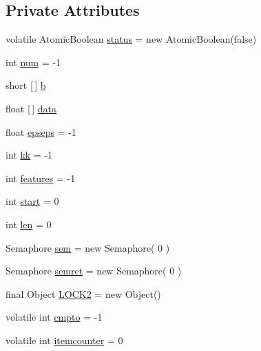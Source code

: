 \subsection*{Private Attributes}
\begin{DoxyCompactItemize}
\item 
volatile Atomic\+Boolean \mbox{\hyperlink{classcom_1_1example_1_1dmocl_1_1dbscan_1_1dbscan__thread2_af5d85cbd68b1063d67e118eb4d99f00d}{status}} = new Atomic\+Boolean(false)
\item 
int \mbox{\hyperlink{classcom_1_1example_1_1dmocl_1_1dbscan_1_1dbscan__thread2_a8c3589585ee7d3dffb56f2815e4cfe5e}{num}} = -\/1
\item 
short \mbox{[}$\,$\mbox{]} \mbox{\hyperlink{classcom_1_1example_1_1dmocl_1_1dbscan_1_1dbscan__thread2_a1eb51ad414e8ce37f6fc7a366a9631f9}{b}}
\item 
float \mbox{[}$\,$\mbox{]} \mbox{\hyperlink{classcom_1_1example_1_1dmocl_1_1dbscan_1_1dbscan__thread2_a1e074f4d486050d2cdd34f11340163d9}{data}}
\item 
float \mbox{\hyperlink{classcom_1_1example_1_1dmocl_1_1dbscan_1_1dbscan__thread2_a925553795864906a7e2b06f30d377e6a}{epseps}} = -\/1
\item 
int \mbox{\hyperlink{classcom_1_1example_1_1dmocl_1_1dbscan_1_1dbscan__thread2_a20cf1118178a289fb4f6a4cf0ae79781}{kk}} = -\/1
\item 
int \mbox{\hyperlink{classcom_1_1example_1_1dmocl_1_1dbscan_1_1dbscan__thread2_af7a32b720e9757e7ea87de852cb928fa}{features}} = -\/1
\item 
int \mbox{\hyperlink{classcom_1_1example_1_1dmocl_1_1dbscan_1_1dbscan__thread2_a069afa516eb9cd0c10e2bd860a97475c}{start}} = 0
\item 
int \mbox{\hyperlink{classcom_1_1example_1_1dmocl_1_1dbscan_1_1dbscan__thread2_a3f37b04b0d50bc1a313285cc42c97b52}{len}} = 0
\item 
Semaphore \mbox{\hyperlink{classcom_1_1example_1_1dmocl_1_1dbscan_1_1dbscan__thread2_acfcf87a7da9d4f495f7d886b7ef16bf0}{sem}} = new Semaphore( 0 )
\item 
Semaphore \mbox{\hyperlink{classcom_1_1example_1_1dmocl_1_1dbscan_1_1dbscan__thread2_a84386ee69872fc108454e9feda715f1a}{semret}} = new Semaphore( 0 )
\item 
final Object \mbox{\hyperlink{classcom_1_1example_1_1dmocl_1_1dbscan_1_1dbscan__thread2_a2baeae9915a08e8feb9be52e169afef5}{L\+O\+C\+K2}} = new Object()
\item 
volatile int \mbox{\hyperlink{classcom_1_1example_1_1dmocl_1_1dbscan_1_1dbscan__thread2_ad857c20706749d220416cf6d5bfa8925}{cmpto}} = -\/1
\item 
volatile int \mbox{\hyperlink{classcom_1_1example_1_1dmocl_1_1dbscan_1_1dbscan__thread2_a1e79239cd7b2996f27715f91743a1078}{itemcounter}} = 0
\end{DoxyCompactItemize}


